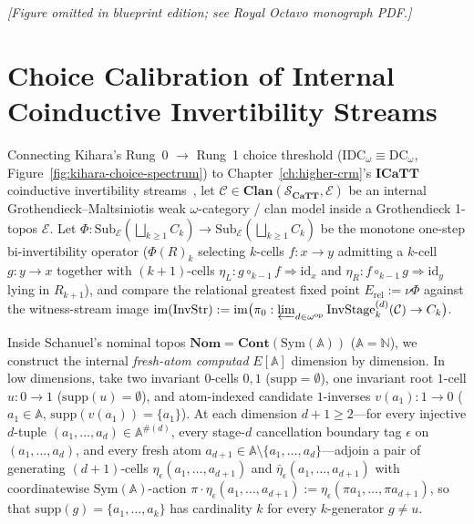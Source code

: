 \begin{center}\emph{[Figure omitted in blueprint edition; see Royal Octavo monograph PDF.]}\label{fig:cubical-amalgamation-dichotomy}\end{center}

\section{Choice Calibration of Internal Coinductive Invertibility Streams}\label{subsec:coinductive-streams-choice}

Connecting Kihara's Rung~0 $\to$ Rung~1 choice threshold ($\mathrm{IDC}_\omega \equiv \mathrm{DC}_\omega$, Figure~\ref{fig:kihara-choice-spectrum}) to Chapter~\ref{ch:higher-crm}'s $\mathbf{ICaTT}$ coinductive invertibility streams~\cite{BCM26,FinsterMimram17,ORW26}, let $\mathcal{C} \in \mathbf{Clan}(\mathcal{S}_{\mathbf{CaTT}}, \mathcal{E})$ be an internal Grothendieck--Maltsiniotis weak $\omega$-category / clan model inside a Grothendieck 1-topos $\mathcal{E}$. Let $\Phi : \mathrm{Sub}_{\mathcal{E}}(\bigsqcup_{k \ge 1} C_k) \to \mathrm{Sub}_{\mathcal{E}}(\bigsqcup_{k \ge 1} C_k)$ be the monotone one-step bi-invertibility operator ($\Phi(R)_k$ selecting $k$-cells $f : x \to y$ admitting a $k$-cell $g : y \to x$ together with $(k+1)$-cells $\eta_L : g \circ_{k-1} f \Rightarrow \mathrm{id}_x$ and $\eta_R : f \circ_{k-1} g \Rightarrow \mathrm{id}_y$ lying in $R_{k+1}$), and compare the relational greatest fixed point $E_{\mathrm{rel}} := \nu\Phi$ against the witness-stream image $\mathrm{im}(\mathrm{InvStr}) := \mathrm{im}\bigl(\pi_0 : \varprojlim_{d \in \omega^{\mathrm{op}}} \mathrm{InvStage}^{(d)}_k(\mathcal{C}) \to C_k\bigr)$.

Inside Schanuel's nominal topos $\mathbf{Nom} = \mathbf{Cont}(\mathrm{Sym}(\mathbb{A}))$ ($\mathbb{A} = \mathbb{N}$), we construct the internal \emph{fresh-atom computad} $E[\mathbb{A}]$ dimension by dimension. In low dimensions, take two invariant $0$-cells $0, 1$ ($\mathrm{supp} = \emptyset$), one invariant root $1$-cell $u : 0 \to 1$ ($\mathrm{supp}(u) = \emptyset$), and atom-indexed candidate $1$-inverses $v(a_1) : 1 \to 0$ ($a_1 \in \mathbb{A}$, $\mathrm{supp}(v(a_1)) = \{a_1\}$). At each dimension $d + 1 \ge 2$---for every injective $d$-tuple $(a_1, \dots, a_d) \in \mathbb{A}^{\#(d)}$, every stage-$d$ cancellation boundary tag $\epsilon$ on $(a_1, \dots, a_d)$, and every fresh atom $a_{d+1} \in \mathbb{A} \setminus \{a_1, \dots, a_d\}$---adjoin a pair of generating $(d+1)$-cells $\eta_\epsilon(a_1, \dots, a_{d+1})$ and $\bar{\eta}_\epsilon(a_1, \dots, a_{d+1})$ with coordinatewise $\mathrm{Sym}(\mathbb{A})$-action $\pi \cdot \eta_\epsilon(a_1, \dots, a_{d+1}) := \eta_\epsilon(\pi a_1, \dots, \pi a_{d+1})$, so that $\mathrm{supp}(g) = \{a_1, \dots, a_k\}$ has cardinality $k$ for every $k$-generator $g \neq u$.

